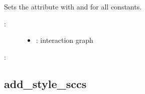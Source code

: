 \documentclass[letterpaper,10pt,english]{sphinxmanual}
\begin{document}
\begin{fulllineitems}
\label{\detokenize{InteractionGraphs:PyBoolNet.InteractionGraphs.add_style_constants}}
Sets the attribute  with  and  for all constants.
\begin{description}
\item[{:}] \leavevmode\begin{itemize}
\item {} 
: interaction graph

\end{itemize}

\end{description}

:

\begin{sphinxVerbatim}[commandchars=\\\{\}]
\end{sphinxVerbatim}

\end{fulllineitems}



\subsection{add\_style\_sccs}
\label{\detokenize{InteractionGraphs:add-style-sccs}}\label{\detokenize{InteractionGraphs:id14}}
\end{document}
